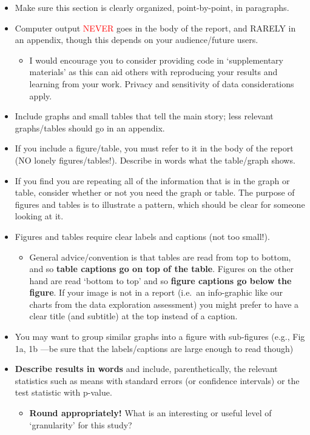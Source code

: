 \documentclass[
  openany]{book}
\providecommand{\tightlist}{%
  \setlength{\itemsep}{0pt}\setlength{\parskip}{0pt}}
\begin{document}
\begin{itemize}
\tightlist
\item
  Make sure this section is clearly organized, point-by-point, in paragraphs.
\item
  Computer output \textcolor{red}{NEVER} goes in the body of the report, and RARELY in an appendix, though this depends on your audience/future users.

  \begin{itemize}
  \tightlist
  \item
    I would encourage you to consider providing code in `supplementary materials' as this can aid others with reproducing your results and learning from your work. Privacy and sensitivity of data considerations apply.\\
  \end{itemize}
\item
  Include graphs and small tables that tell the main story; less relevant graphs/tables should go in an appendix.\\
\item
  If you include a figure/table, you must refer to it in the body of the report (NO lonely figures/tables!). Describe in words what the table/graph shows.
\item
  If you find you are repeating all of the information that is in the graph or table, consider whether or not you need the graph or table.
  The purpose of figures and tables is to illustrate a pattern, which should be clear for someone looking at it.
\item
  Figures and tables require clear labels and captions (not too small!).

  \begin{itemize}
  \tightlist
  \item
    General advice/convention is that tables are read from top to bottom, and so \textbf{table captions go on top of the table}. Figures on the other hand are read `bottom to top' and so \textbf{figure captions go below the figure}. If your image is not in a report (i.e.~an info-graphic like our charts from the data exploration assessment) you might prefer to have a clear title (and subtitle) at the top instead of a caption.
  \end{itemize}
\item
  You may want to group similar graphs into a figure with sub-figures (e.g., Fig 1a, 1b ---be sure that the labels/captions are large enough to read though)
\item
  \textbf{Describe results in words} and include, parenthetically, the relevant statistics such as means with standard errors (or confidence intervals) or the test statistic with p-value.

  \begin{itemize}
  \tightlist
  \item
    \textbf{Round appropriately!} What is an interesting or useful level of `granularity' for this study?
  \end{itemize}
\end{itemize}
\end{document}
